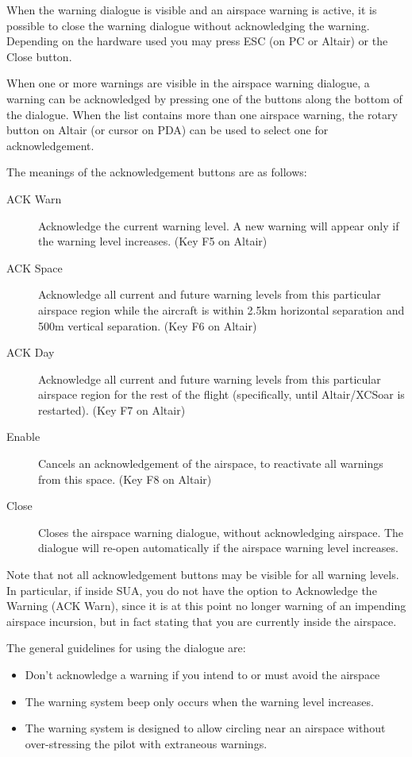 When the warning dialogue is visible and an airspace warning is
active, it is possible to close the warning dialogue without acknowledging the warning.
Depending on the hardware used you may press ESC (on PC or Altair) or the Close button.

When one or more warnings are visible in the airspace warning dialogue,
a warning can be acknowledged by pressing one of the buttons along the bottom
of the dialogue.  When the list contains more than one airspace warning,
the rotary button on Altair (or cursor on PDA) can be used to select one
for acknowledgement.

The meanings of the acknowledgement buttons are as follows:
\begin{description}
\item[ACK Warn]  Acknowledge the current warning level.  A new warning will appear
only if the warning level increases.  (Key F5 on Altair)
\item[ACK Space]  Acknowledge all current and future warning levels from this
particular airspace region while the aircraft is within 2.5km horizontal separation
and 500m vertical separation. (Key F6 on Altair)
\item[ACK Day]  Acknowledge all current and future warning levels from this particular
airspace region for the rest of the flight (specifically, until Altair/XCSoar
is restarted). (Key F7 on Altair)
\item[Enable]  Cancels an acknowledgement of the airspace, to reactivate all warnings
from this space. (Key F8 on Altair)
\item[Close] Closes the airspace warning dialogue, without acknowledging airspace.
  The dialogue will re-open automatically if the airspace warning level increases.
\end{description}

Note that not all acknowledgement buttons may be visible for all
warning levels.  In particular, if inside SUA, you do not have the
option to Acknowledge the Warning (ACK Warn), since it is at this
point no longer warning of an impending airspace incursion, but in
fact stating that you are currently inside the airspace.

The general guidelines for using the dialogue are:
\begin{itemize}
\item  Don't acknowledge a warning if you intend to or must avoid the airspace
\item  The warning system beep only occurs when the warning level increases.
\item  The warning system is designed to allow circling near an airspace without
  over-stressing the pilot with extraneous warnings.
\end{itemize}

